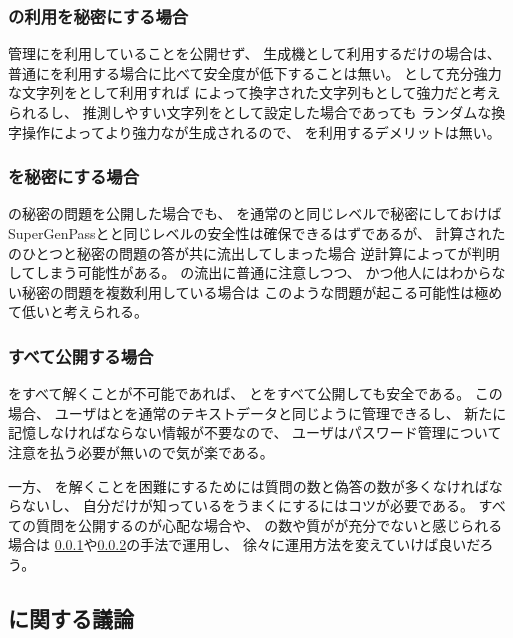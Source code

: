 \documentclass[twoside]{wiss}
\begin{document}
\subsubsection{\protect{\textsf{\EP}}の利用を秘密にする場合}
\label{pattern1}

{\PW}管理に{\EP}を利用していることを公開せず、
{\PW}生成機として利用するだけの場合は、
普通に{\PW}を利用する場合に比べて安全度が低下することは無い。
{\PW}として充分強力な文字列を{\SS}として利用すれば
{\EP}によって換字された文字列も{\PW}として強力だと考えられるし、
推測しやすい文字列を{\SS}として設定した場合であっても
ランダムな換字操作によってより強力な{\PW}が生成されるので、
{\EP}を利用するデメリットは無い。

\subsubsection{{\SS}を秘密にする場合}
\label{pattern2}

{\EP}の秘密の問題を公開した場合でも、
{\SS}を通常の{\PW}と同じレベルで秘密にしておけば
SuperGenPassと\cite{SuperGenPass}と同じレベルの安全性は確保できるはずであるが、
計算された{\PW}のひとつと秘密の問題の答が共に流出してしまった場合
逆計算によって{\SS}が判明してしまう可能性がある。
{\PW}の流出に普通に注意しつつ、
かつ他人にはわからない秘密の問題を複数利用している場合は
このような問題が起こる可能性は極めて低いと考えられる。


\subsubsection{すべて公開する場合}

{\SQ}をすべて解くことが不可能であれば、
{\SS}と{\SQ}をすべて公開しても安全である。
この場合、
ユーザは{\SQ}と{\SS}を通常のテキストデータと同じように管理できるし、
新たに記憶しなければならない情報が不要なので、
ユーザはパスワード管理について注意を払う必要が無いので気が楽である。

一方、
{\SQ}を解くことを困難にするためには質問の数と偽答の数が多くなければならないし、
自分だけが知っている{\EM}をうまく{\SQ}にするにはコツが必要である。
すべての質問を公開するのが心配な場合や、
{\SQ}の数や質がが充分でないと感じられる場合は
\ref{pattern1}や\ref{pattern2}の手法で運用し、
徐々に運用方法を変えていけば良いだろう。

\subsection{{\SQ}に関する議論}
\end{document}
